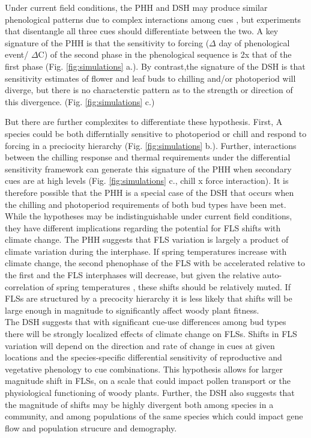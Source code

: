 \documentclass[11pt]{article}\usepackage[]{graphicx}\usepackage[]{color}
\begin{document}
\noindent Under current field conditions, the PHH and DSH may produce similar phenological patterns due to complex interactions among cues \citep{}, but experiments that disentangle all three cues should differentiate between the two. A key signature of the PHH is that the sensitivity to forcing ($\Delta$ day of phenological event/ $\Delta$\degree C) of the second phase in the phenological sequence is 2x that of the first phase (Fig. \ref{fig:simulations} a.). By contrast,the signature of the DSH is that sensitivity estimates of flower and leaf buds to chilling and/or photoperiod will diverge, but there is no characterstic pattern as to the strength or direction of this divergence. (Fig. \ref{fig:simulations} c.)

But there are further complexites to differentiate these hypothesis. First, A species could be both differntially sensitive to photoperiod or chill and respond to forcing in a preciocity hierarchy (Fig. \ref{fig:simulations} b.). Further, interactions between the chilling response and thermal requirements under the differential sensitivity framework can generate this signature of the PHH when secondary cues are at high levels (Fig. \ref{fig:simulations} c., chill x force interaction). It is therefore possible that the PHH is a special case of the DSH that occurs when the chilling and photoperiod requirements of both bud types have been met.\\

\noident While the hypotheses may be indistinguishable under current field conditions, they have different implications regarding the potential for FLS shifts with climate change. The PHH suggests that FLS variation is largely a product of climate variation during the interphase. If spring temperatures increase with climate change, the second phenophase of the FLS with be accelerated relative to the first and the FLS interphases will decrease, but given the relative auto-correlation of spring temperatures \citep{Di-Cecco:2018aa}, these shifts should be relatively muted. If FLSs are structured by a precocity hierarchy it is less likely that shifts will be large enough in magnitude to significantly affect woody plant fitness.\\

\noindent The DSH suggests that with significant cue-use differences among bud types there will be strongly localized effects of climate change on FLSs. Shifts in FLS variation will depend on the direction and rate of change in cues at given locations and the species-specific differential sensitivity of reproductive and vegetative phenology to cue combinations. This hypothesis allows for larger magnitude shift in FLSs, on a scale that could impact pollen transport or the physiological functioning of woody plants. Further, the DSH also suggests that the magnitude of shifts may be highly divergent both among species in a community, and among populations of the same species which could impact gene flow and population strucure and demography.\\
\end{document}
